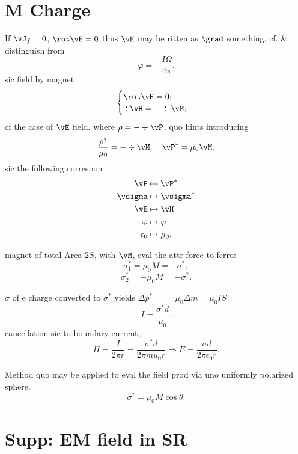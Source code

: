 \documentclass{ctexart}
\begin{document}
\section{M Charge} %
\label{sec:m_charge}

If $\vJ_f = 0$, $\rot \vH = 0$ thus $\vH$ may be ritten as $\grad$ something.
cf. \& distinguish from
\[ \varphi = -\frac{I\Omega}{4\pi}. \]
sic field by magnet
\[ \begin{cases}
	\rot \vH = 0;\\
	\div \vH = -\div\vM;
\end{cases} \]
cf the case of $\vE$ field. where $\rho = -\div \vP$. quo hints introducing
\[ \frac{\rho^*}{\mu_0} = -\div \vM,\quad \vP^* = \mu_0 \vM. \]
sic the following correspon
\begin{align*}
	\vP &\mapsto \vP^*\\
	\vsigma &\mapsto \vsigma^*\\
	\vE &\mapsto \vH\\
	\varphi &\mapsto \varphi\\
	\epsilon_0 &\mapsto \mu_0.
\end{align*}
\begin{ex}
	magnet of total Area $2S$, with $\vM$, eval the attr force to ferro:
	\[ \sigma_1^* = \mu_0 M = +\sigma^*, \]
	\[ \sigma_2^* = -\mu_0 M = -\sigma^*. \]
\end{ex}
\begin{ex}
	$\sigma$ of e charge converted to $\sigma^*$ yields $\Delta p^* = =\mu_0 \Delta m = \mu_0 IS$
	\[ I = \frac{\sigma^* d}{\mu_0}. \]
	cancellation sic to boundary current,
	\[ H = \frac{I}{2\pi r}=\frac{\sigma^* d}{2\pi mu_0 r}\Rightarrow E = \frac{\sigma d}{2\pi\epsilon_0 r}. \]
\end{ex}
\begin{ex}
	Method quo may be applied to eval the field prod via uno uniformly polarized sphere.
	\[ \sigma^* = \mu_0 M\cos\theta. \]
\end{ex}


\section{Supp: EM field in SR} %
\label{sec:supp_em_field_in_sr}
\end{document}
